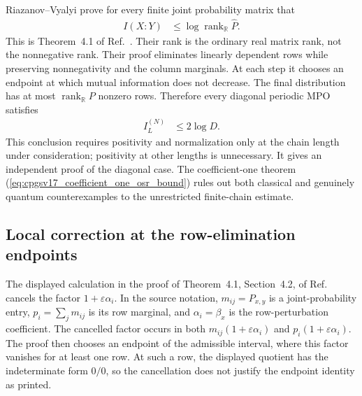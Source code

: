 \documentclass[11pt]{article}
\begin{document}
Riazanov--Vyalyi prove for every finite joint probability matrix that
\begin{align}
    I(X:Y)
        &\leq
        \log\operatorname{rank}_{\mathbb R}\widehat P.
    \label{eq:cpgsv17_classical_information_rank_bound}
\end{align}
This is Theorem~4.1 of Ref.~\cite{Riazanov2017PSDRank}. Their rank is the
ordinary real matrix rank, not the nonnegative rank. Their proof eliminates
linearly dependent rows while preserving nonnegativity and the column
marginals. At each step it chooses an endpoint at which mutual information
does not decrease. The final distribution has at most
$\operatorname{rank}_{\mathbb R}P$ nonzero rows. Therefore every diagonal
periodic MPO satisfies
\begin{align}
    I_L^{(N)}
        &\leq 2\log D.
    \label{eq:cpgsv17_diagonal_finite_chain_bound}
\end{align}
This conclusion requires positivity and normalization only at the chain length
under consideration; positivity at other lengths is unnecessary. It gives an
independent proof of the diagonal case. The coefficient-one theorem
(\ref{eq:cpgsv17_coefficient_one_osr_bound}) rules out both classical and
genuinely quantum counterexamples to the unrestricted finite-chain estimate.

\subsection{Local correction at the row-elimination endpoints}

The displayed calculation in the proof of Theorem~4.1, Section~4.2, of
Ref.~\cite{Riazanov2017PSDRank} cancels the factor
$1+\varepsilon\alpha_i$. In the source notation,
$m_{ij}=P_{x,y}$ is a joint-probability entry,
$p_i=\sum_jm_{ij}$ is its row marginal, and
$\alpha_i=\beta_x$ is the row-perturbation coefficient. The cancelled factor
occurs in both $m_{ij}(1+\varepsilon\alpha_i)$ and
$p_i(1+\varepsilon\alpha_i)$. The proof then chooses an endpoint of the
admissible interval, where this factor vanishes for at least one row. At such a
row, the displayed quotient has the indeterminate form $0/0$, so the
cancellation does not justify the endpoint identity as printed.
\end{document}
